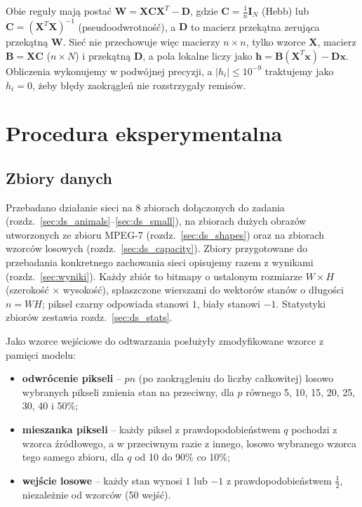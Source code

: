 \documentclass{article}
\begin{document}
Obie reguły mają postać $\mathbf{W} = \mathbf{X}\mathbf{C}\mathbf{X}^{T} - \mathbf{D}$,
gdzie $\mathbf{C} = \frac{1}{n}\mathbf{I}_{N}$ (Hebb) lub $\mathbf{C} = (\mathbf{X}^{T}\mathbf{X})^{-1}$ (pseudoodwrotność),
a $\mathbf{D}$ to macierz przekątna zerująca przekątną $\mathbf{W}$.
Sieć nie przechowuje więc macierzy $n \times n$, tylko wzorce $\mathbf{X}$, macierz $\mathbf{B} = \mathbf{X}\mathbf{C}$ ($n \times N$)
i przekątną $\mathbf{D}$, a pola lokalne liczy jako $\mathbf{h} = \mathbf{B}(\mathbf{X}^{T}\mathbf{x}) - \mathbf{D}\mathbf{x}$.
Obliczenia wykonujemy w podwójnej precyzji, a $|h_i| \le 10^{-9}$ traktujemy jako $h_i = 0$,
żeby błędy zaokrągleń nie rozstrzygały remisów.

\section{Procedura eksperymentalna}
\label{sec:proc}

\subsection{Zbiory danych}
\label{sec:dane}
Przebadano działanie sieci na 8 zbiorach dołączonych do zadania (rozdz.~\ref{sec:ds_animals}--\ref{sec:ds_small}),
na zbiorach dużych obrazów utworzonych ze zbioru MPEG-7 (rozdz.~\ref{sec:ds_shapes})
oraz na zbiorach wzorców losowych (rozdz.~\ref{sec:ds_capacity}).
Zbiory przygotowane do przebadania konkretnego zachowania sieci opisujemy razem z wynikami (rozdz.~\ref{sec:wyniki}).
Każdy zbiór to bitmapy o ustalonym rozmiarze $W \times H$ (szerokość $\times$ wysokość),
spłaszczone wierszami do wektorów stanów o długości $n = WH$;
piksel czarny odpowiada stanowi $1$, biały stanowi $-1$.
Statystyki zbiorów zestawia rozdz.~\ref{sec:ds_stats}.

Jako wzorce wejściowe do odtwarzania posłużyły zmodyfikowane wzorce z pamięci modelu:
\begin{itemize}
  \item \textbf{odwrócenie pikseli} -- $pn$ (po zaokrągleniu do liczby całkowitej) losowo wybranych pikseli
        zmienia stan na przeciwny, dla $p$ równego 5, 10, 15, 20, 25, 30, 40 i 50\%;
  \item \textbf{mieszanka pikseli} -- każdy piksel z prawdopodobieństwem $q$ pochodzi z wzorca źródłowego,
        a w przeciwnym razie z innego, losowo wybranego wzorca tego samego zbioru, dla $q$ od 10 do 90\% co 10\%;
  \item \textbf{wejście losowe} -- każdy stan wynosi $1$ lub $-1$ z prawdopodobieństwem $\frac{1}{2}$,
        niezależnie od wzorców (50 wejść).
\end{itemize}
\end{document}
